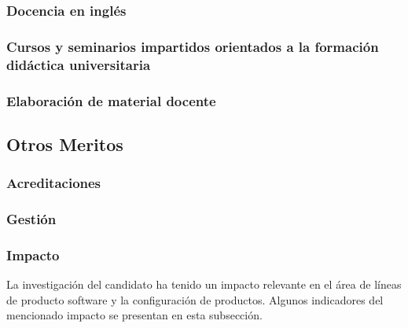 \subsubsection{Docencia en inglés}

\subsubsection{Cursos y seminarios impartidos orientados a la formación didáctica universitaria}

\subsubsection{Elaboración de material docente}
\startitems
{}
\stopitems
 
\subsection{Otros Meritos}

\subsubsection{Acreditaciones}
\startitems
{}
\stopitems


\subsubsection{Gestión}
\startitems
{}
\stopitems

\subsubsection{Impacto}
La investigación del candidato ha tenido un impacto relevante en el área de líneas de producto software y la configuración de productos. Algunos indicadores del mencionado impacto se presentan en esta subsección.\\

\startitems
{}
\stopitems
